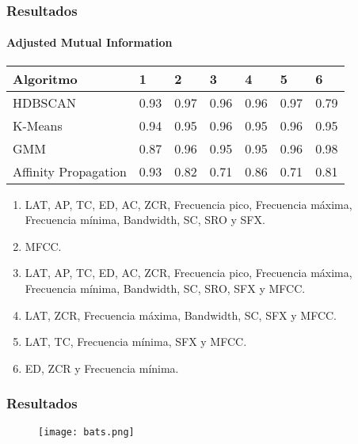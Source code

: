 \begin{frame}
    \frametitle{Resultados}
    \framesubtitle{Adjusted Mutual Information}

    \begin{table}[H]
        \centering
        \begin{tabular}{lllllll}
            \hline
            Algoritmo & 1 & 2 & 3 & 4 & 5 & 6  \\ \hline
            HDBSCAN & 0.93 & 0.97 & 0.96 & 0.96 & 0.97 & 0.79 \\
            K-Means & 0.94 & 0.95 & 0.96 & 0.95 & 0.96 & 0.95 \\
            GMM & 0.87 & 0.96 & 0.95 & 0.95 & 0.96 & \cellcolor[HTML]{FFFC9E}0.98 \\
            Affinity Propagation & 0.93 & 0.82 & 0.71 & 0.86 & 0.71 & 0.81
        \end{tabular}
    \end{table}

    {\tiny
    \begin{enumerate}
        \item LAT, AP, TC, ED, AC, ZCR, Frecuencia pico, Frecuencia máxima, Frecuencia mínima, Bandwidth, SC, SRO y SFX\@. %
        \item MFCC\@. %
        \item LAT, AP, TC, ED, AC, ZCR, Frecuencia pico, Frecuencia máxima, Frecuencia mínima, Bandwidth, SC, SRO, SFX y MFCC\@.
        \item LAT, ZCR, Frecuencia máxima, Bandwidth, SC, SFX y MFCC\@. %
        \item LAT, TC, Frecuencia mínima, SFX y MFCC\@. %
        \item ED, ZCR y Frecuencia mínima.
    \end{enumerate}
    }

\end{frame}

\begin{frame}
    \frametitle{Resultados}

    \begin{figure}[!h]
        \centering
        \texttt{[image: bats.png]}
    \end{figure}

\end{frame}

